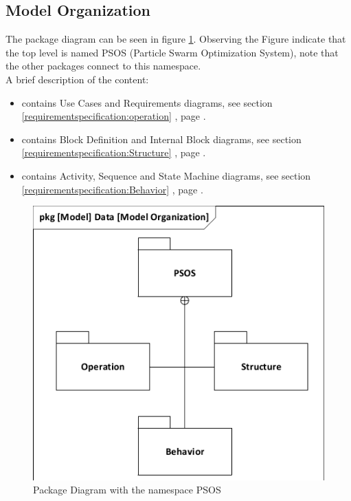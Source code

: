 \subsection{Model Organization}
The package diagram can be seen in figure \ref{fig:pkg}. Observing the Figure indicate that the top level is named PSOS (Particle Swarm Optimization System), note that the other packages connect to this namespace.\\

A brief description of the content:
\begin{itemize}
	\item {} contains Use Cases and Requirements diagrams, see section \ref{requirementspecification:operation} , page \pageref{requirementspecification:operation}.
	\item {} contains Block Definition and Internal Block diagrams, see section \ref{requirementspecification:Structure} , page \pageref{requirementspecification:Structure}.
	\item {} contains Activity, Sequence and State Machine diagrams, see section \ref{requirementspecification:Behavior} , page \pageref{requirementspecification:Behavior}.

\end{itemize}

\begin{figure}[H]
	\centering
	\includegraphics[width=0.5\linewidth]{diagram/pkg_data_model_organization.pdf}
	\caption{Package Diagram with the namespace PSOS}
	\label{fig:pkg}
\end{figure}